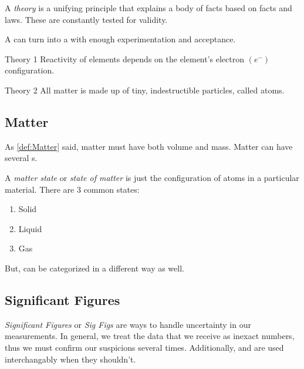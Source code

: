 \begin{definition}[Theory] \label{def:Theory}
  A \emph{theory} is a unifying principle that explains a body of facts based on facts and laws.
  These are constantly tested for validity.
  \begin{remark}
    A  can turn into a  with enough experimentation and acceptance.
  \end{remark}
\end{definition}

\begin{example}[]{Theory 1}
  Reactivity of elements depends on the element's electron $\left( e^{-} \right)$ configuration.
\end{example}

\begin{example}[]{Theory 2}
  All matter is made up of tiny, indestructible particles, called atoms.
\end{example}

\subsection{Matter} \label{subsec:Matter}
As \cref{def:Matter} said, matter must have both volume and mass.
Matter can have several s.

\begin{definition} \label{def:Matter State}
  A \emph{matter state} or \emph{state of matter} is just the configuration of atoms in a particular material.
  There are 3 common states:
  \begin{enumerate}
  \item Solid
  \item Liquid
  \item Gas
  \end{enumerate}
\end{definition}

But,  can be categorized in a different way as well.
% 

\subsection{Significant Figures} \label{subsec:Sig Figs}
\begin{definition} \label{def:Sig Figs}
  \emph{Significant Figures} or \emph{Sig Figs} are ways to handle uncertainty in our measurements.
  In general, we treat the data that we receive as inexact numbers, thus we must confirm our suspicions several times.
  Additionally,  and  are used interchangably when they shouldn't.
\end{definition}


